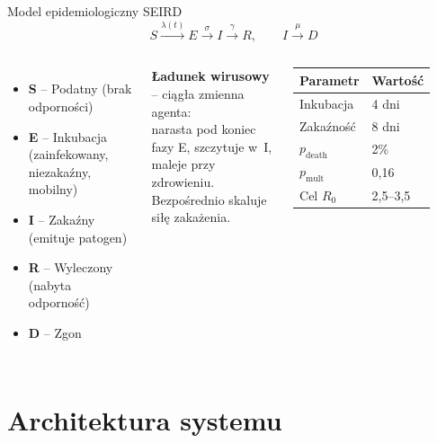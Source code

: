 \documentclass[aspectratio=1610, polish]{beamer}
\begin{document}
\begin{frame}{Model epidemiologiczny SEIRD}
  \[
    S \xrightarrow{\lambda(t)} E \xrightarrow{\sigma} I \xrightarrow{\gamma} R,
    \qquad I \xrightarrow{\mu} D
  \]

  \begin{columns}[T]
    \begin{itemize}
      \item \textbf{S} -- Podatny (brak odporności)
      \item \textbf{E} -- Inkubacja (zainfekowany, niezakaźny, mobilny)
      \item \textbf{I} -- Zakaźny (emituje patogen)
      \item \textbf{R} -- Wyleczony (nabyta odporność)
      \item \textbf{D} -- Zgon
    \end{itemize}
    \vspace{0.3cm}
    \textbf{Ładunek wirusowy} -- ciągła zmienna agenta:\\
    narasta pod koniec fazy E, szczytuje w~I,\\
    maleje przy zdrowieniu. Bezpośrednio skaluje siłę zakażenia.

    \begin{tabular}{ll}
      \toprule
      Parametr & Wartość \\
      \midrule
      Inkubacja & 4 dni \\
      Zakaźność & 8 dni \\
      $p_{\text{death}}$ & 2\% \\
      $p_{\text{mult}}$ & 0,16 \\
      Cel $R_0$ & 2,5--3,5 \\
      \bottomrule
    \end{tabular}
  \end{columns}
\end{frame}

\section{Architektura systemu}
\end{document}
